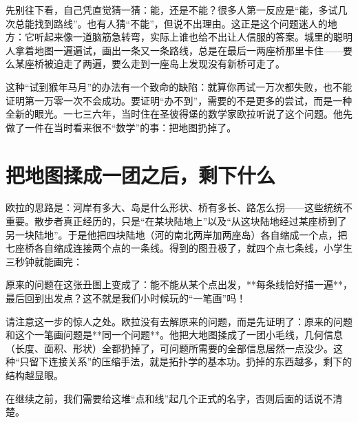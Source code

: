 先别往下看，自己凭直觉猜一猜：能，还是不能？很多人第一反应是“能，多试几次总能找到路线”。也有人猜“不能”，但说不出理由。这正是这个问题迷人的地方：它听起来像一道脑筋急转弯，实际上谁也给不出让人信服的答案。城里的聪明人拿着地图一遍遍试，画出一条又一条路线，总是在最后一两座桥那里卡住——要么某座桥被迫走了两遍，要么走到一座岛上发现没有新桥可走了。

这种“试到猴年马月”的办法有一个致命的缺陷：就算你再试一万次都失败，也不能证明第一万零一次不会成功。要证明“办不到”，需要的不是更多的尝试，而是一种全新的眼光。一七三六年，当时住在圣彼得堡的数学家欧拉听说了这个问题。他先做了一件在当时看来很不“数学”的事：把地图扔掉了。

\section{把地图揉成一团之后，剩下什么}

欧拉的思路是：河岸有多大、岛是什么形状、桥有多长、路怎么拐——这些统统不重要。散步者真正经历的，只是“在某块陆地上”以及“从这块陆地经过某座桥到了另一块陆地”。于是他把四块陆地（河的南北两岸加两座岛）各自缩成一个点，把七座桥各自缩成连接两个点的一条线。得到的图丑极了，就四个点七条线，小学生三秒钟就能画完：

\begin{center}
\end{center}

原来的问题在这张丑图上变成了：能不能从某个点出发，**每条线恰好描一遍**，最后回到出发点？这不就是我们小时候玩的“一笔画”吗！

请注意这一步的惊人之处。欧拉没有去解原来的问题，而是先证明了：原来的问题和这个一笔画问题是**同一个问题**。他把大地图揉成了一团小毛线，几何信息（长度、面积、形状）全都扔掉了，可问题所需要的全部信息居然一点没少。这种“只留下连接关系”的压缩手法，就是拓扑学的基本功。扔掉的东西越多，剩下的结构越显眼。

在继续之前，我们需要给这堆“点和线”起几个正式的名字，否则后面的话说不清楚。

